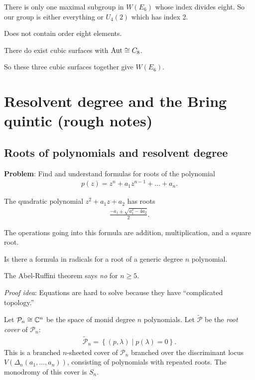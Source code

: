 \documentclass[11pt]{amsart}
\let\til\widetilde
\begin{document}
\begin{fact} There is only one maximal subgroup in $W(E_6)$ whose index divides eight. So our group is either everything or $U_4(2)$ which has index 2.
\end{fact}

\begin{fact} Does not contain order eight elements.
\end{fact}

There do exist cubic surfaces with $\mathrm{Aut} \cong C_8$.

So these three cubic surfaces together give $W(E_6)$.

\section{Resolvent degree and the Bring quintic (rough notes)}

\subsection{Roots of polynomials and resolvent degree}

\textbf{Problem}: Find and understand formulas for roots of the polynomial
\begin{align*}
    p(z) = z^n + a_1 z^{n-1} + \ldots + a_n.
\end{align*}
%

\begin{example} The quadratic polynomial $z^2 + a_1 z +a_2$ has roots
\begin{align*}
    \frac{-a_1 \pm \sqrt{a_1^2- 4a_2}}{2}.
\end{align*}
\end{example}
The operations going into this formula are addition, multiplication, and a square root.

\begin{question} Is there a formula in radicals for a root of a generic degree $n$ polynomial.
\end{question}

The Abel-Ruffini theorem says \emph{no} for $n\ge 5$.

\textit{Proof idea}: Equations are hard to solve because they have ``complicated topology.''

Let $\mathcal{P}_n \cong \mathbb{C}^n$ be the space of monid degree $n$ polynomials. Let $\til{\mathcal{P}}$ be the \textit{root cover} of $\mathcal{P}_n$:
\begin{align*}
    \til{\mathcal{P}}_n = \left\{ (p,\lambda) \mid p(\lambda) = 0 \right\}.
\end{align*}
This is a branched $n$-sheeted cover of $\mathcal{P}_n$ branched over the discriminant locus $V(\Delta_n(a_1, \ldots, a_n))$, consisting of polynomials with repeated roots. The monodromy of this cover is $S_n$.
\end{document}
